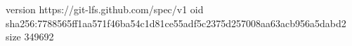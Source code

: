 version https://git-lfs.github.com/spec/v1
oid sha256:7788565ff1aa571f46ba54c1d81ce55adf5c2375d257008aa63acb956a5dabd2
size 349692

